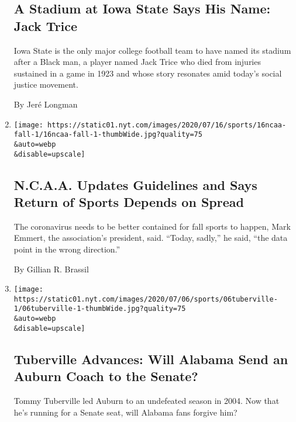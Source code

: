 \begin{enumerate}
  \hypertarget{a-stadium-at-iowa-state-says-his-name-jack-trice}{%
  \subsection{A Stadium at Iowa State Says His Name: Jack
  Trice}\label{a-stadium-at-iowa-state-says-his-name-jack-trice}}

  Iowa State is the only major college football team to have named its
  stadium after a Black man, a player named Jack Trice who died from
  injuries sustained in a game in 1923 and whose story resonates amid
  today's social justice movement.

  By Jeré Longman
\item
  \href{/2020/07/16/sports/ncaafootball/ncaa-guidelines-fall-sports.html}{}

  \texttt{[image: https://static01.nyt.com/images/2020/07/16/sports/16ncaa-fall-1/16ncaa-fall-1-thumbWide.jpg?quality=75\\\&auto=webp\\\&disable=upscale]}

  \hypertarget{ncaa-updates-guidelines-and-says-return-of-sports-depends-on-spread}{%
  \subsection{N.C.A.A. Updates Guidelines and Says Return of Sports
  Depends on
  Spread}\label{ncaa-updates-guidelines-and-says-return-of-sports-depends-on-spread}}

  The coronavirus needs to be better contained for fall sports to
  happen, Mark Emmert, the association's president, said. ``Today,
  sadly,'' he said, ``the data point in the wrong direction.''

  By Gillian R. Brassil
\item
  \href{/2020/07/15/sports/tommy-tuberville-alabama-auburn.html}{}

  \texttt{[image: https://static01.nyt.com/images/2020/07/06/sports/06tuberville-1/06tuberville-1-thumbWide.jpg?quality=75\\\&auto=webp\\\&disable=upscale]}

  \hypertarget{tuberville-advances-will-alabama-send-an-auburn-coach-to-the-senate}{%
  \subsection{Tuberville Advances: Will Alabama Send an Auburn Coach to
  the
  Senate?}\label{tuberville-advances-will-alabama-send-an-auburn-coach-to-the-senate}}

  Tommy Tuberville led Auburn to an undefeated season in 2004. Now that
  he's running for a Senate seat, will Alabama fans forgive him?


\end{enumerate}
